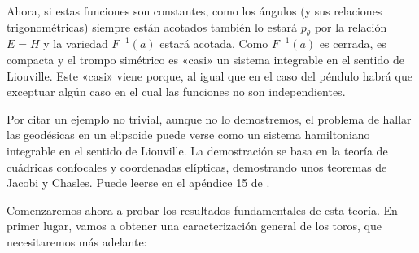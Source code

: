 \begin{ejemplo}
  Ahora, si estas funciones son constantes, como los ángulos (y sus relaciones trigonométricas) siempre están acotados también lo estará $p_{\theta}$ por la relación $E=H$ y la variedad $F^{-1}(a)$ estará acotada. Como $F^{-1}(a)$ es cerrada, es compacta y el trompo simétrico es «casi» un sistema integrable en el sentido de Liouville. Este «casi» viene porque, al igual que en el caso del péndulo habrá que exceptuar algún caso en el cual las funciones no son independientes.
\end{ejemplo}

\begin{ejemplo}
  Por citar un ejemplo no trivial, aunque no lo demostremos, el problema de hallar las geodésicas en un elipsoide puede verse como un sistema hamiltoniano integrable en el sentido de Liouville. La demostración se basa en la teoría de cuádricas confocales y coordenadas elípticas, demostrando unos teoremas de Jacobi y Chasles. Puede leerse en el apéndice 15 de \cite{arnold}.
\end{ejemplo}

Comenzaremos ahora a probar los resultados fundamentales de esta teoría. En primer lugar, vamos a obtener una caracterización general de los toros, que necesitaremos más adelante:

